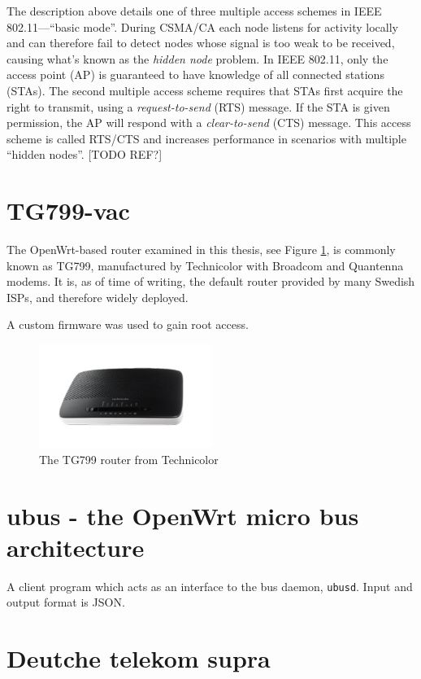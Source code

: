 The description above details one of three multiple access schemes in IEEE
802.11—``basic mode''. During CSMA/CA each node listens for activity locally
and can therefore fail to detect nodes whose signal is too weak to be
received, causing what's known as the \emph{hidden node} problem. In
IEEE 802.11, only the access point (AP) is guaranteed to have knowledge of all
connected stations (STAs). The second multiple access scheme requires that
STAs first acquire the right to transmit, using a \emph{request-to-send} (RTS)
message. If the STA is given permission, the AP will respond with a
\emph{clear-to-send} (CTS) message. This access scheme is called RTS/CTS and
increases performance in scenarios with multiple ``hidden nodes''. [TODO REF?]

\section{TG799-vac}

The OpenWrt-based router examined in this thesis, see Figure \ref{fig:tg799}, is
commonly known as TG799, manufactured by Technicolor with Broadcom and Quantenna
modems. It is, as of time of writing, the default router provided by many
Swedish ISPs, and therefore widely deployed.

A custom firmware was used to gain root access.

\begin{figure}
\center
\includegraphics[width=0.5\textwidth]{images/tg799.png}
\caption{The TG799 router from Technicolor}
\label{fig:tg799}
\end{figure}

\section{ubus - the OpenWrt micro bus architecture}

A client program which acts as an interface to the bus daemon, \texttt{ubusd}.
Input and output format is JSON.

\section{Deutche telekom supra}

